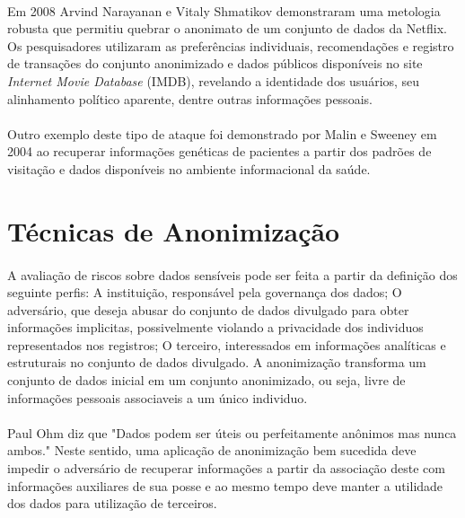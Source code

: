 \paragraph{} Em 2008 Arvind Narayanan e Vitaly Shmatikov demonstraram uma metologia robusta\cite{netflixDeanon}  que permitiu quebrar o anonimato de um conjunto de dados da Netflix. Os pesquisadores utilizaram as preferências individuais, recomendações e registro de transações do conjunto anonimizado e dados públicos disponíveis no site \textit{Internet Movie Database} (IMDB), revelando a identidade dos usuários, seu alinhamento político aparente, dentre outras informações pessoais.

\paragraph{} Outro exemplo deste tipo de ataque foi demonstrado por Malin e Sweeney\cite{malin2004} em 2004 ao recuperar informações genéticas de pacientes a partir dos padrões de visitação e dados disponíveis no ambiente informacional da saúde.

\section{Técnicas de Anonimização}

\paragraph{} A avaliação de riscos sobre dados sensíveis pode ser feita a partir da definição dos seguinte perfis: A instituição, responsável pela governança dos dados; O adversário, que deseja abusar do conjunto de dados divulgado para obter informações implicitas, possivelmente violando a privacidade dos individuos representados nos registros; O terceiro, interessados em informações analíticas e estruturais no conjunto de dados divulgado. A anonimização transforma um conjunto de dados inicial em um conjunto anonimizado, ou seja, livre de informações pessoais associaveis a um único individuo.

\paragraph{} Paul Ohm\cite{ohm2009} diz que "Dados podem ser úteis ou perfeitamente anônimos mas nunca ambos." Neste sentido, uma aplicação de anonimização bem sucedida deve impedir o adversário de recuperar informações a partir da associação deste com informações auxiliares de sua posse e ao mesmo tempo deve manter a utilidade dos dados para utilização de terceiros. 

